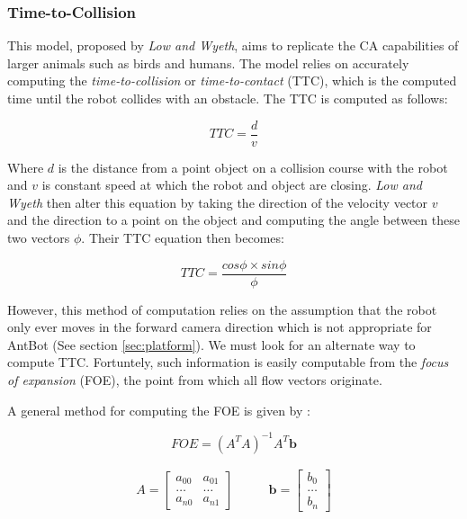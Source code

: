 \documentclass[a4paper,12pt]{article}
\begin{document}
\subsubsection{ Time-to-Collision }
This model, proposed by \textit{Low and Wyeth}\cite{Low2005}, aims to replicate the CA capabilities
of larger animals such as birds and humans. The model relies on accurately computing the
\textit{time-to-collision} or \textit{time-to-contact} (TTC), which is the computed time until the
robot collides with an obstacle. The TTC is computed as follows:

\begin{equation}
TTC = \frac{d}{v}
\end{equation}

Where $d$ is the distance from a point object on a collision course with the robot and $v$ is
constant speed at which the robot and object are closing.
\newline
\textit{Low and Wyeth} then alter this equation by taking the direction of the velocity vector $v$
and the direction to a point on the object and computing the angle between these two vectors $\phi$.
Their TTC equation then becomes:

\begin{equation}
 TTC = \frac{cos\phi \times sin\phi}{\phi}
\end{equation}

However, this method of computation relies on the assumption that the robot only ever moves in the
forward camera direction which is not appropriate for AntBot (See section \ref{sec:platform}).
We must look for an alternate way to compute TTC. Fortuntely, such information is easily
computable from the \textit{focus of expansion} (FOE), the point from which all flow vectors
originate.
\newline

A general method for computing the FOE is given by \cite{ODonovan2005}:

\begin{equation}
  FOE = (A^TA)^{-1}A^T\mathbf{b}
\end{equation}

\begin{equation*}
  \begin{split}
 A = 
\begin{bmatrix}
  a_{00} & a_{01}\\
  \dots  & \dots \\
  a_{n0} &  a_{n1}
\end{bmatrix}
\qquad
\end{split}
\begin{split}
\mathbf{b} =
\begin{bmatrix}
  b_0 \\
  \dots \\
  b_n
\end{bmatrix}
\end{split}
\end{equation*}
\newline
\end{document}
